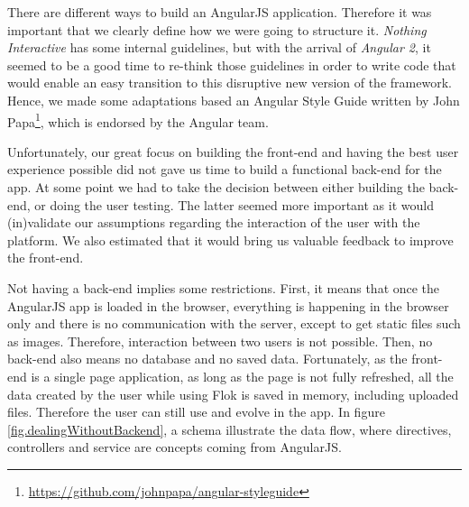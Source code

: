 \documentclass[a4paper,12pt, oneside]{article}
\begin{document}
There are different ways to build an AngularJS application.
Therefore it was important that we clearly define how we were going to structure it.
\emph{Nothing Interactive} has some internal guidelines, but with the arrival of \emph{Angular 2}, it seemed to be a good time to re-think those guidelines in order to write code that would enable an easy transition to this disruptive new version of the framework.
Hence, we made some adaptations based an Angular Style Guide written by John Papa\footnote{\url{https://github.com/johnpapa/angular-styleguide}}, which is endorsed by the Angular team.

Unfortunately, our great focus on building the front-end and having the best user experience possible did not gave us time to build a functional back-end for the app.
At some point we had to take the decision between either building the back-end, or doing the user testing.
The latter seemed more important as it would (in)validate our assumptions regarding the interaction of the user with the platform.
We also estimated that it would bring us valuable feedback to improve the front-end.

Not having a back-end implies some restrictions.
First, it means that once the AngularJS app is loaded in the browser, everything is happening in the browser only and there is no communication with the server, except to get static files such as images.
Therefore, interaction between two users is not possible.
Then, no back-end also means no database and no saved data.
Fortunately, as the front-end is a single page application, as long as the page is not fully refreshed, all the data created by the user while using Flok is saved in memory, including uploaded files.
Therefore the user can still use and evolve in the app.
In figure \ref{fig.dealingWithoutBackend}, a schema illustrate the data flow, where directives, controllers and service are concepts coming from AngularJS.
\end{document}
